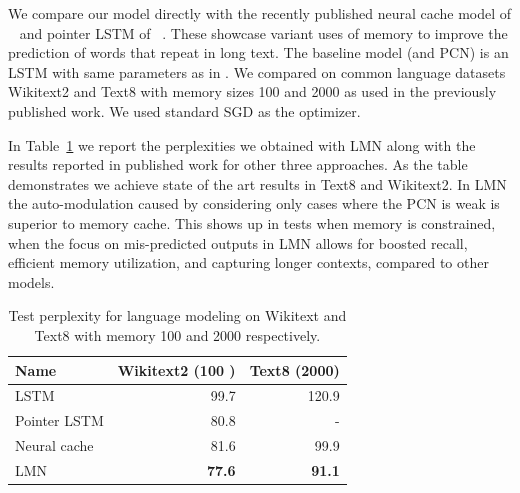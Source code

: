 \documentclass[letterpaper]{article} %
\begin{document}
We compare our model directly with the recently published neural cache model of ~\cite{grave2016improving} and pointer LSTM of ~\cite{merity2016pointer}. These showcase variant uses of memory to improve the prediction of words that repeat in long text.  The baseline model (and PCN) is an LSTM with same parameters as in \cite{grave2016improving}.
%
We compared on common language datasets Wikitext2 and Text8 with memory sizes 100 and 2000 as used in the previously published work. We used standard SGD as the optimizer. 

 In Table~\ref{tab-lm} we report the perplexities we obtained with LMN along with the results reported in published work for other three approaches. As the table demonstrates we achieve state of the art results in Text8 and Wikitext2. In LMN the auto-modulation caused by considering only cases where the PCN is weak is superior to memory cache. This shows up in tests when memory is constrained, when the focus on mis-predicted outputs in LMN allows for boosted recall, efficient memory utilization, and capturing longer contexts, compared to other models.

\begin{table}
\begin{center}
\begin{tabular}{|l|r|r|} \hline
Name &    Wikitext2 (100 ) &  Text8 (2000)\\ \hline
LSTM & 99.7 & 120.9 \\
Pointer LSTM &	80.8	& -\\ 
Neural cache &  81.6 &  99.9\\
LMN &	\textbf{77.6}	& \textbf{91.1}\\ \hline
\end{tabular}
\end{center}
\caption{ \label{tab-lm} Test perplexity for language modeling on Wikitext and Text8 with memory 100 and 2000 respectively.}  
\end{table}
\end{document}
